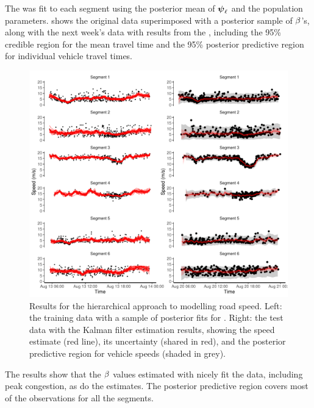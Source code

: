 The \kf{} was fit to each segment using the posterior mean of $\mathbf{\boldsymbol{\psi}}_\ell$ and the population parameters.  shows the original data superimposed with a posterior sample of $\beta$'s, along with the next week's data with results from the \kf{}, including the 95\% credible region for the mean travel time and the 95\% posterior predictive region for individual vehicle travel times.







\begin{knitrout}\small
{}\color{fgcolor}\begin{figure}
\includegraphics[width=\textwidth]{figure/nw_model_n2_kf-1} \caption[Results for the hierarchical approach to modelling road speed]{Results for the hierarchical approach to modelling road speed. Left: the training data with a sample of posterior fits for . Right: the test data with the Kalman filter estimation results, showing the speed estimate (red line), its uncertainty (shared in red), and the posterior predictive region for vehicle speeds (shaded in grey).}\label{fig:nw_model_n2_kf}
\end{figure}


\end{knitrout}

The results show that the $\beta$ values estimated with  nicely fit the data, including peak congestion, as do the \kf{} estimates. The posterior predictive region covers most of the observations for all the segments.
